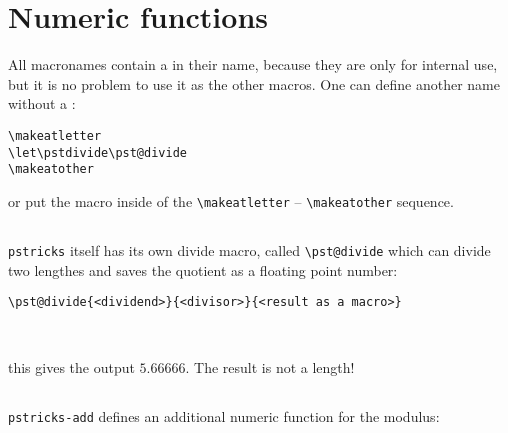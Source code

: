 \section{Numeric functions}

All macronames contain a \textat{} in their name, because they are only for internal use,
but it is no problem to use it as the other macros. One can define another name without 
a \textat{}:
\begin{verbatim}
\makeatletter
\let\pstdivide\pst@divide
\makeatother
\end{verbatim}

or put the macro inside of the \verb+\makeatletter+ -- \verb+\makeatother+ sequence.

\subsection{}

\verb+pstricks+ itself has its own divide macro, called \verb+\pst@divide+ which can divide two lengthes and saves the quotient as a floating point number:

\begin{verbatim}
\pst@divide{<dividend>}{<divisor>}{<result as a macro>}
\end{verbatim}

\begin{LTXexample}[width=2cm]
\makeatletter
\pst@divide{34pt}{6pt}\quotient \quotient\\
\pst@divide{-6pt}{34pt}\quotient \quotient
\makeatother
\end{LTXexample}

\noindent this gives the output $5.66666$. The result is not a length!

\subsection{}
\verb+pstricks-add+ defines an additional numeric function for the modulus:

